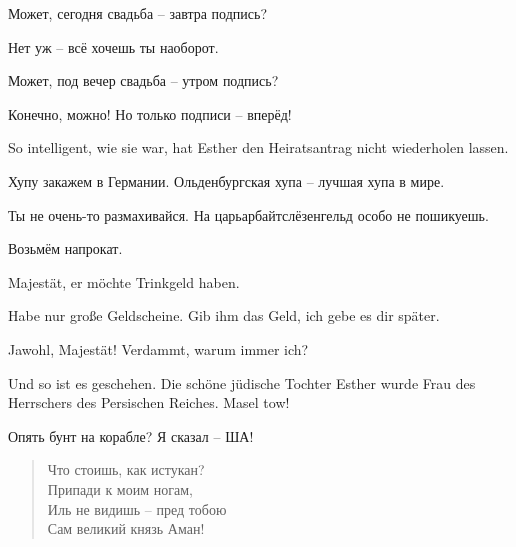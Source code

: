 \documentclass[12pt,a4paper,titlepage]{article}
\begin{document}
\begin{drama}
Может, сегодня свадьба -- завтра подпись?

Нет уж -- всё хочешь ты наоборот.

Может, под вечер свадьба -- утром подпись­­?

Конечно, можно! Но только подписи -- вперёд!

\vspace{3ex}

\uespeaks
So intelligent, wie sie war, hat Esther den Heiratsantrag nicht wiederholen lassen.

\vspace{3ex}

\espeaks
Хупу закажем в Германии. Ольденбургская хупа -- лучшая хупа в мире.

\ahspeaks
Ты не очень-то размахивайся. На царьарбайтслёзенгельд особо не пошикуешь.

\espeaks
Возьмём напрокат.

\scene


\uespeaks
Majestät, er möchte Trinkgeld haben.

\ahspeaks
Habe nur große Geldscheine. Gib ihm das Geld, ich gebe es dir später.

\uespeaks
Jawohl, Majestät!  Verdammt, warum immer ich?



\uespeaks
Und so ist es geschehen. Die schöne jüdische Tochter Esther
wurde Frau des Herrschers des Persischen Reiches. Masel tow!


\scene


\amspeaks
Опять бунт на корабле? Я сказал -- ША!

\amspeaks {}
\begin{verse}
Что стоишь, как истукан?\\
Припади к моим ногам,\\
Иль не видишь -- пред тобою\\
Сам великий князь Аман!\\
\end{verse}


\end{drama}
\end{document}
